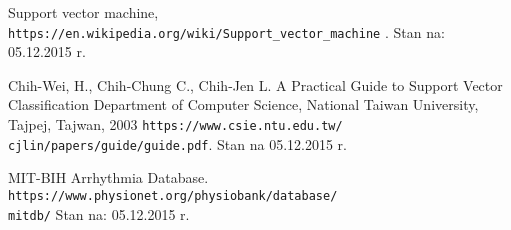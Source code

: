 \begin{thebibliography}{99}
Support vector machine,
\newblock \texttt{https://en.wikipedia.org/wiki/Support\_vector\_machine} .
\newblock Stan na: 05.12.2015 r.

Chih-Wei, H., Chih-Chung C., Chih-Jen L.
\newblock A Practical Guide to Support Vector Classification
\newblock Department of Computer Science, National Taiwan University, Tajpej, Tajwan, 2003
\newblock \texttt{https://www.csie.ntu.edu.tw/~ cjlin/papers/guide/guide.pdf}.
\newblock Stan na 05.12.2015 r.

MIT-BIH Arrhythmia Database.
\newblock \texttt{https://www.physionet.org/physiobank/database/\\mitdb/}
\newblock Stan na: 05.12.2015 r.


\end{thebibliography}